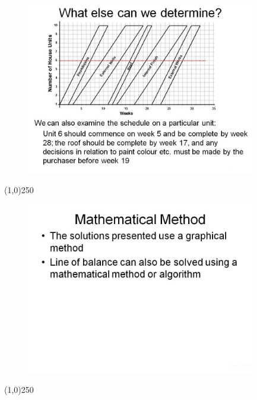 \begin{frame}
\begin{figure}
	\centering
		\includegraphics[width = 10.0cm]{oldnotes/Slide269.jpg}
\end{figure}
\end{frame}
\begin{center}\line(1,0){250}\end{center}






\begin{frame}
\begin{figure}
	\centering
		\includegraphics[width = 10.0cm]{oldnotes/Slide270.jpg}
\end{figure}
\end{frame}
\begin{center}\line(1,0){250}\end{center}






